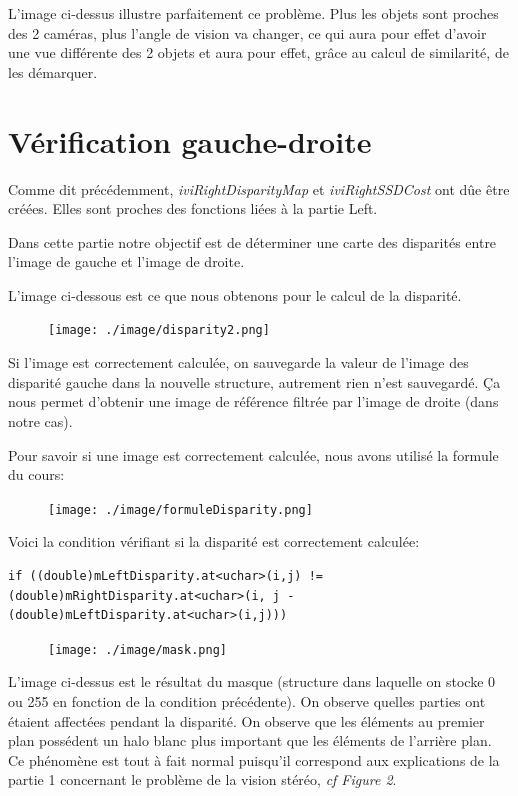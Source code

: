 \documentclass[a4paper,12pt]{report}
\begin{document}
L'image ci-dessus illustre parfaitement ce problème. Plus les objets sont proches des 2 caméras, plus l'angle de vision va changer, ce qui aura pour effet d'avoir une vue différente des 2 objets et aura pour effet, grâce au calcul de similarité, de les démarquer.

\section*{Vérification gauche-droite}

Comme dit précédemment, \textit{iviRightDisparityMap} et \textit{iviRightSSDCost} ont dûe être créées. Elles sont proches des fonctions liées à la partie Left.

Dans cette partie notre objectif est de déterminer une carte des disparités entre l'image de gauche et l'image de droite.

L'image ci-dessous est ce que nous obtenons pour le calcul de la disparité. 
\begin{figure}[!ht]
	\center
	\texttt{[image: ./image/disparity2.png]}
\end{figure}

Si l'image est correctement calculée, on sauvegarde la valeur de l'image des disparité gauche dans la nouvelle structure, autrement rien n'est sauvegardé. Ça nous permet d'obtenir une image de référence filtrée par l'image de droite (dans notre cas).

Pour savoir si une image est correctement calculée, nous avons utilisé la formule du cours:

\begin{figure}[!ht]
	\center
	\texttt{[image: ./image/formuleDisparity.png]}
\end{figure}

Voici la condition vérifiant si la disparité est correctement calculée:
\begin{lstlisting}[style=C++]
if ((double)mLeftDisparity.at<uchar>(i,j) != (double)mRightDisparity.at<uchar>(i, j - (double)mLeftDisparity.at<uchar>(i,j)))
\end{lstlisting}

\newpage

\begin{figure}[!ht]
	\center
	\texttt{[image: ./image/mask.png]}
\end{figure}

L'image ci-dessus est le résultat du masque (structure dans laquelle on stocke 0 ou 255 en fonction de la condition précédente). On observe quelles parties ont étaient affectées pendant la disparité. On observe que les éléments au premier plan possédent un halo blanc plus important que les éléments de l'arrière plan. Ce phénomène est tout à fait normal puisqu'il correspond aux explications de la partie 1 concernant le problème de la vision stéréo, \textit{cf Figure 2}.
\end{document}
